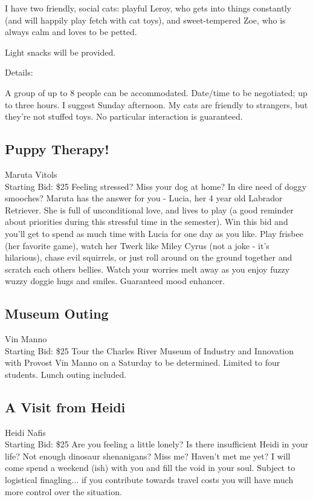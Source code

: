 \documentclass[11pt]{article}
\begin{document}
I have two friendly, social cats: playful Leroy, who gets into things constantly (and will happily play fetch with cat toys), and sweet-tempered Zoe, who is always calm and loves to be petted. 

Light snacks will be provided.


Details:

A group of up to 8 people can be accommodated.
Date/time to be negotiated; up to three hours. I suggest Sunday afternoon.
My cats are friendly to strangers, but they're not stuffed toys. No particular interaction is guaranteed.
\subsection{Puppy Therapy!}
Maruta Vitols
\\
Starting Bid: \$25
\newline
Feeling stressed? Miss your dog at home? In dire need of doggy smooches? Maruta has the answer for you - Lucia, her 4 year old Labrador Retriever. She is full of unconditional love, and lives to play (a good reminder about priorities during this stressful time in the semester). Win this bid and you'll get to spend as much time with Lucia for one day as you like. Play frisbee (her favorite game), watch her Twerk like Miley Cyrus (not a joke - it's hilarious), chase evil squirrels, or just roll around on the ground together and scratch each others bellies. Watch your worries melt away as you enjoy fuzzy wuzzy doggie hugs and smiles. Guaranteed mood enhancer.
\subsection{Museum Outing}
Vin Manno
\\
Starting Bid: \$25
\newline
Tour the Charles River Museum of Industry and Innovation with Provost Vin Manno on a Saturday to be determined. Limited to four students. Lunch outing included.
\subsection{A Visit from Heidi}
Heidi Nafis
\\
Starting Bid: \$25
\newline
Are you feeling a little lonely? Is there insufficient Heidi in your life? Not enough dinosaur shenanigans? Miss me? Haven't met me yet? I will come spend a weekend (ish) with you and fill the void in your soul. Subject to logistical finagling... if you contribute towards travel costs you will have much more control over the situation.
\end{document}

